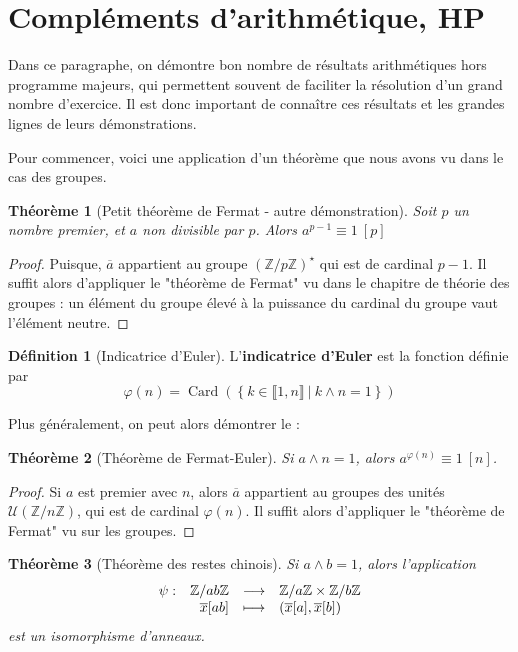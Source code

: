 \documentclass[french]{book}
\newcommand{\Z}{\mathbb{Z}}
\newcommand{\st}{^\star}
\theoremstyle{plain}
\newtheorem{thm}{Théorème}[chapter]
\theoremstyle{definition}
\newtheorem{dfn}{Définition}[chapter]
\theoremstyle{remark}
\DeclareMathOperator{\card}{Card}
\begin{document}
\section{Compléments d'arithmétique, HP}
Dans ce paragraphe, on démontre bon nombre de résultats arithmétiques hors programme majeurs, qui permettent souvent de faciliter la résolution d'un grand nombre d'exercice. Il est donc important de connaître ces résultats et les grandes lignes de leurs démonstrations. \\ \par
Pour commencer, voici une application d'un théorème que nous avons vu dans le cas des groupes.
\begin{thm}[Petit théorème de Fermat - autre démonstration]
	Soit $p$ un nombre premier, et $a$ non divisible par $p$. Alors $a^{p-1}\equiv 1 \ [p]$
\end{thm}
\begin{proof}
	Puisque, $\overline{a}$ appartient au groupe $\left(\Z/p\Z\right)\st$ qui est de cardinal $p-1$. Il suffit alors d'appliquer le "théorème de Fermat" vu dans le chapitre de théorie des groupes : un élément du groupe élevé à la puissance du cardinal du groupe vaut l'élément neutre.
\end{proof}
\begin{dfn}[Indicatrice d'Euler]
	L'\textbf{indicatrice d'Euler} est la fonction définie par $$\varphi(n)=\card\left(\left\{k\in\llbracket1,n\rrbracket \ | \ k\wedge n=1\right\}\right)$$ 
\end{dfn}
Plus généralement, on peut alors démontrer le : 
\begin{thm}[Théorème de Fermat-Euler]
	Si $a\wedge n=1$, alors $a^{\varphi(n)} \equiv 1 \ [n]$.
\end{thm}
\begin{proof}
	Si $a$ est premier avec $n$, alors $\overline{a}$ appartient au groupes des unités $\mathcal{U}\left(\Z/n\Z\right)$, qui est de cardinal $\varphi(n)$. Il suffit alors d'appliquer le "théorème de Fermat" vu sur les groupes.
\end{proof}
\begin{thm}[Théorème des restes chinois]
	Si $a\wedge b=1$, alors l'application $$
	\begin{array}[t]{lrcl}
		\psi: & \Z/ab\Z& \longrightarrow & \Z/a\Z\times\Z/b\Z \\
		& \overline{x}[ab] & \longmapsto & (\overline{x}[a],\overline{x}[b])
	\end{array}
	$$ est un isomorphisme d'anneaux.
\end{thm}
\end{document}
